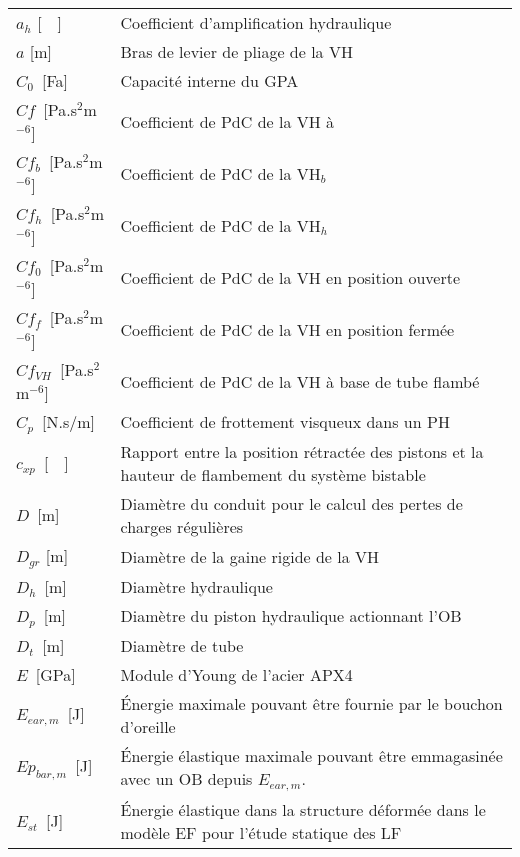 \begin{table}
      \begin{tabular}{l m{12cm}}
\toprule
$a_h$ [~~]           & Coefficient d'amplification hydraulique                            \\
$a$ [m]         & Bras de levier de pliage de la VH                                  \\ \cline{1-1}
$C_0$~[Fa]       & Capacité interne du GPA \\
$Cf$~[Pa.s$^2$m$^{-6}$]            & Coefficient de PdC de la VH à   \\
$Cf_{b}$~[Pa.s$^2$m$^{-6}$]        & Coefficient de PdC de la VH$_b$                       \\
$Cf_{h}$~[Pa.s$^2$m$^{-6}$]        & Coefficient de PdC de la VH$_h$  \\
$Cf_{0}$~[Pa.s$^2$m$^{-6}$]        & Coefficient de PdC de la VH en position ouverte                    \\
$Cf_{f}$~[Pa.s$^2$m$^{-6}$]        & Coefficient de PdC de la VH en position fermée                     \\
$Cf_{VH}$~[Pa.s$^2$m$^{-6}$]       & Coefficient de PdC de la VH à base de tube flambé   \\
$C_p$~[N.s/m]    & Coefficient de frottement visqueux dans un PH \\
$c_{xp}$~[~~]      & Rapport entre la position rétractée des pistons et la hauteur de flambement du système bistable \\  \cline{1-1}
$D$~[m]              & Diamètre du conduit pour le calcul des pertes de charges régulières    \\
$D_{gr}$ [m]         & Diamètre de la gaine rigide de la VH                               \\
$D_h$~[m]           & Diamètre hydraulique \\ 
$D_p$~[m]            & Diamètre du piston hydraulique actionnant l'OB                \\
$D_t$~[m]       & Diamètre de tube \\  \cline{1-1}
$E$~[GPa]    & Module d'Young de l'acier APX4 \\
$E_{ear,m}$~[J]          & Énergie maximale pouvant être fournie par le bouchon d'oreille \\
$Ep_{bar,m}$~[J]         & Énergie élastique maximale pouvant être emmagasinée avec un OB depuis $E_{ear,m}$. \\
$E_{st}$~[J]          & Énergie élastique dans la structure déformée dans le modèle EF pour l'étude statique des LF \\

\end{tabular}
\end{table}

